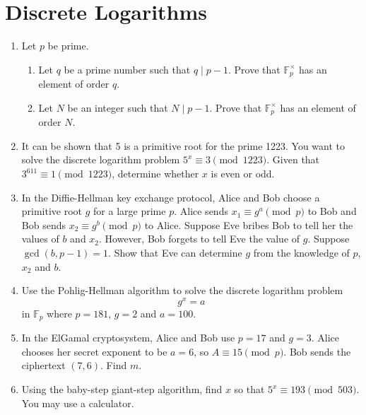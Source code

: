\documentclass[11pt,letterpaper]{article}
\newcommand{\F}{\mathbb{F}}
\begin{document}
\section{Discrete Logarithms}
\begin{enumerate}
    \item Let $p$ be prime.
    \begin{enumerate}
        \item Let $q$ be a prime number such that $q\mid p-1$.
        Prove that $\F_p^\times$ has an element of order $q$.

        \item Let $N$ be an integer such that $N\mid p-1$.
        Prove that $\F_p^\times$ has an element of order $N$.
    \end{enumerate}

    \item It can be shown that 5 is a primitive root for the prime 1223.
    You want to solve the discrete logarithm problem $5^x\equiv 3\pmod{1223}$.
    Given that $3^{611} \equiv 1\pmod{1223}$, determine whether $x$ is even or odd.

    \item In the Diffie-Hellman key exchange protocol, Alice and Bob choose a primitive root $g$ for a large prime $p$.
    Alice sends $x_1\equiv g^a\pmod p$ to Bob and Bob sends $x_2 \equiv g^b\pmod p$ to Alice.
    Suppose Eve bribes Bob to tell her the values of $b$ and $x_2$.
    However, Bob forgets to tell Eve the value of $g$.
    Suppose $\gcd(b, p-1) = 1$.
    Show that Eve can determine $g$ from the knowledge of $p$, $x_2$ and $b$.

    \item Use the Pohlig-Hellman algorithm to solve the discrete logarithm problem
    \[
        g^x = a
    \]
    in $\F_p$ where $p = 181$, $g = 2$ and $a = 100$.

    \item In the ElGamal cryptosystem, Alice and Bob use $p=17$ and $g=3$.
    Alice chooses her secret exponent to be $a=6$, so $A\equiv 15\pmod p$.
    Bob sends the ciphertext $(7,6)$.
    Find $m$.

    \item Using the baby-step giant-step algorithm, find $x$ so that $5^x\equiv 193\pmod{503}$.
    You may use a calculator.
\end{enumerate}
\end{document}
